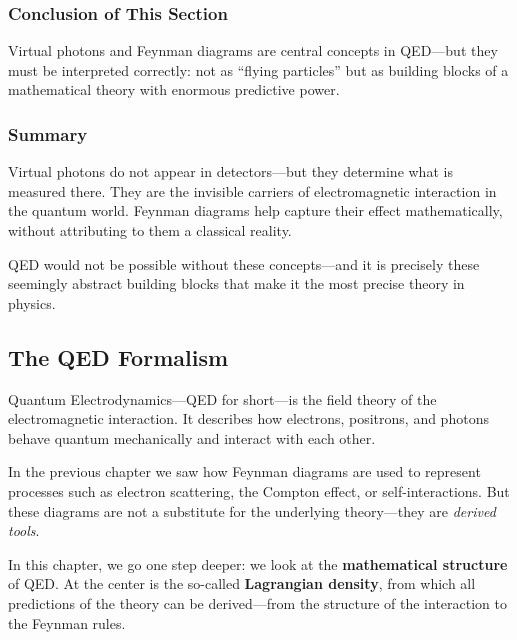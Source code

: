 \subsubsection*{Conclusion of This Section}
Virtual photons and Feynman diagrams are central concepts in QED—but they must be interpreted correctly: not as “flying particles” but as building blocks of a mathematical theory with enormous predictive power.

\subsubsection{Summary}

Virtual photons do not appear in detectors—but they determine what is measured there. They are the invisible carriers of electromagnetic interaction in the quantum world. Feynman diagrams help capture their effect mathematically, without attributing to them a classical reality.

QED would not be possible without these concepts—and it is precisely these seemingly abstract building blocks that make it the most precise theory in physics.

\subsection{The QED Formalism}

Quantum Electrodynamics—QED for short—is the field theory of the electromagnetic interaction. It describes how electrons, positrons, and photons behave quantum mechanically and interact with each other.

In the previous chapter we saw how Feynman diagrams are used to represent processes such as electron scattering, the Compton effect, or self-interactions. But these diagrams are not a substitute for the underlying theory—they are \emph{derived tools}.

In this chapter, we go one step deeper: we look at the \textbf{mathematical structure} of QED. At the center is the so-called \textbf{Lagrangian density}, from which all predictions of the theory can be derived—from the structure of the interaction to the Feynman rules.

